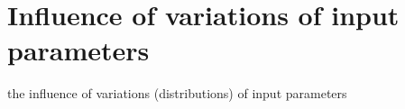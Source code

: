 
\chapter{Influence of variations of input parameters}
\label{cap:influence}

the influence of variations (distributions) of input parameters \\

\lipsum[1]

